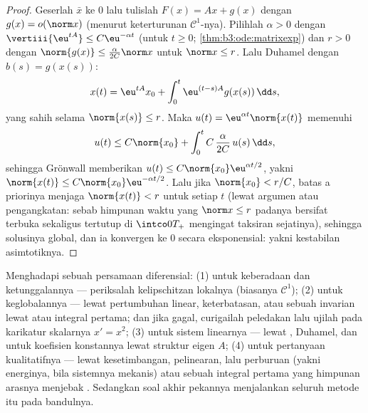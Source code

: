 \begin{proof}
Geserlah $\bar x$ ke $0$ lalu tulislah $F(x) = Ax + g(x)$ dengan
$g(x) = o(\norm x)$ (menurut keterturunan $\mathcal C^1$-nya). Pilihlah
$\alpha > 0$ dengan $\vertiii{\eu^{tA}} \leq C\eu^{-\alpha t}$
(untuk $t \geq 0$; \cref{thm:b3:ode:matrixexp}) dan $r > 0$ dengan
$\norm{g(x)} \leq \frac{\alpha}{2C}\norm x$ untuk $\norm x \leq
r$. Lalu Duhamel dengan $b(s) = g(x(s))$:
\[
x(t) = \eu^{tA}x_0 + \int_0^t\eu^{(t-s)A}g(x(s))\,\dd s,
\]
yang sahih selama $\norm{x(s)} \leq r$. Maka $u(t) =
\eu^{\alpha t}\norm{x(t)}$ memenuhi
\[
u(t) \leq C\norm{x_0} +
\int_0^{t}C\,\frac{\alpha}{2C}\,u(s)\,\dd s ,
\]
sehingga Grönwall memberikan $u(t) \leq C\norm{x_0}\eu^{\alpha t/2}$,
yakni $\norm{x(t)} \leq C\norm{x_0}\eu^{-\alpha t/2}$. Lalu jika
$\norm{x_0} < r/C$, batas a priorinya menjaga $\norm{x(t)} <
r$ untuk setiap $t$ (lewat argumen  atau pengangkatan: sebab himpunan
waktu yang $\norm x \leq r$ padanya bersifat terbuka sekaligus tertutup di
$\intco0{T_+}$ mengingat taksiran sejatinya), sehingga solusinya
global, dan ia konvergen ke $0$ secara eksponensial: yakni kestabilan
asimtotiknya.
\end{proof}

\begin{method}\label{met:b3:ode:strategy}
Menghadapi sebuah persamaan diferensial: (1) untuk keberadaan dan ketunggalannya --- periksalah
kelipschitzan lokalnya (biasanya $\mathcal C^1$); (2) untuk keglobalannya --- lewat pertumbuhan
linear, keterbatasan, atau sebuah  invarian lewat 
atau integral pertama; dan jika gagal, curigailah peledakan
lalu ujilah pada karikatur skalarnya $x' = x^2$; (3) untuk sistem
linearnya --- lewat , Duhamel, dan untuk koefisien
konstannya lewat struktur eigen $A$; (4) untuk pertanyaan
kualitatifnya --- lewat kesetimbangan, pelinearan, lalu perburuan  (yakni energinya, bila sistemnya mekanis) atau sebuah integral
pertama yang himpunan arasnya menjebak . Sedangkan soal akhir
pekannya menjalankan seluruh metode itu pada bandulnya.
\end{method}


